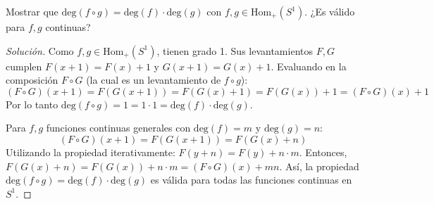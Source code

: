 \begin{ejercicio}
	Mostrar que $\text{deg}(f \circ g) = \text{deg}(f) \cdot \text{deg}(g)$ con $f, g \in \text{Hom}_+(S^1)$. ¿Es válido para $f, g$ continuas?
\end{ejercicio}
\begin{proof}[Solución]
	Como $f, g \in \text{Hom}_+(S^1)$, tienen grado 1. Sus levantamientos $F, G$ cumplen $F(x+1)=F(x)+1$ y $G(x+1)=G(x)+1$.
	Evaluando en la composición $F \circ G$ (la cual es un levantamiento de $f \circ g$):
	$$ (F \circ G)(x+1) = F(G(x+1)) = F(G(x)+1) = F(G(x)) + 1 = (F \circ G)(x) + 1 $$
	Por lo tanto $\text{deg}(f \circ g) = 1 = 1 \cdot 1 = \text{deg}(f) \cdot \text{deg}(g)$.
	
	Para $f,g$ funciones continuas generales con $\text{deg}(f)=m$ y $\text{deg}(g)=n$:
	$$ (F \circ G)(x+1) = F(G(x+1)) = F(G(x)+n) $$
	Utilizando la propiedad iterativamente: $F(y+n) = F(y) + n \cdot m$. 
	Entonces, $F(G(x)+n) = F(G(x)) + n \cdot m = (F \circ G)(x) + mn$.
	Así, la propiedad $\text{deg}(f \circ g) = \text{deg}(f) \cdot \text{deg}(g)$ es válida para todas las funciones continuas en $S^1$.
\end{proof}

